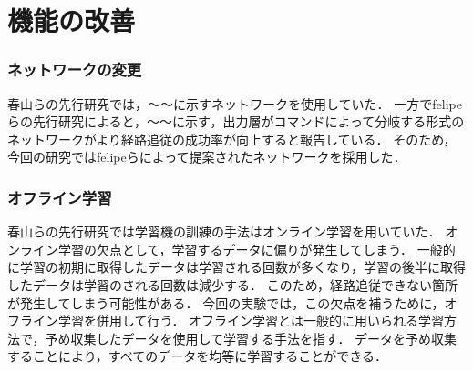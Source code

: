 \chapter{機能の改善}
\label{chap:method}
% 
\subsection{ネットワークの変更}
春山らの先行研究では，～～に示すネットワークを使用していた．
一方でfelipeらの先行研究によると，～～に示す，出力層がコマンドによって分岐する形式のネットワークがより経路追従の成功率が向上すると報告している．
そのため，今回の研究ではfelipeらによって提案されたネットワークを採用した．
\subsection{オフライン学習}
春山らの先行研究では学習機の訓練の手法はオンライン学習を用いていた．
オンライン学習の欠点として，学習するデータに偏りが発生してしまう．
一般的に学習の初期に取得したデータは学習される回数が多くなり，学習の後半に取得したデータは学習のされる回数は減少する．
このため，経路追従できない箇所が発生してしまう可能性がある．
今回の実験では，この欠点を補うために，オフライン学習を併用して行う．
オフライン学習とは一般的に用いられる学習方法で，予め収集したデータを使用して学習する手法を指す．
データを予め収集することにより，すべてのデータを均等に学習することができる．



